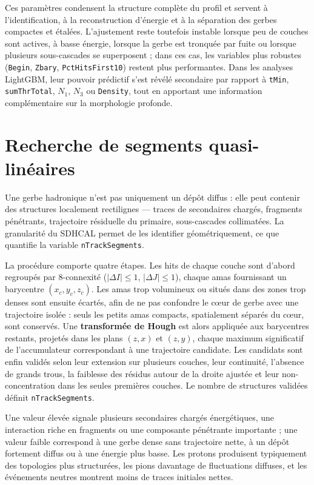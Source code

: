 Ces paramètres condensent la structure complète du profil et servent à l'identification, à la reconstruction d'énergie et à la séparation des gerbes compactes et étalées. L'ajustement reste toutefois instable lorsque peu de couches sont actives, à basse énergie, lorsque la gerbe est tronquée par fuite ou lorsque plusieurs sous-cascades se superposent ; dans ces cas, les variables plus robustes (\texttt{Begin}, \texttt{Zbary}, \texttt{PctHitsFirst10}) restent plus performantes. Dans les analyses LightGBM, leur pouvoir prédictif s'est révélé secondaire par rapport à \texttt{tMin}, \texttt{sumThrTotal}, \(N_1\), \(N_3\) ou \texttt{Density}, tout en apportant une information complémentaire sur la morphologie profonde.

\section{Recherche de segments quasi-linéaires}
\label{annexe:tracksegments}

Une gerbe hadronique n'est pas uniquement un dépôt diffus : elle peut contenir des structures localement rectilignes — traces de secondaires chargés, fragments pénétrants, trajectoire résiduelle du primaire, sous-cascades collimatées. La granularité du SDHCAL permet de les identifier géométriquement, ce que quantifie la variable \texttt{nTrackSegments}.

La procédure comporte quatre étapes. Les hits de chaque couche sont d'abord regroupés par 8-connexité (\(|\Delta I|\le1\), \(|\Delta J|\le1\)), chaque amas fournissant un barycentre \((x_c,y_c,z_c)\). Les amas trop volumineux ou situés dans des zones trop denses sont ensuite écartés, afin de ne pas confondre le cœur de gerbe avec une trajectoire isolée : seuls les petits amas compacts, spatialement séparés du cœur, sont conservés. Une \textbf{transformée de Hough} est alors appliquée aux barycentres restants, projetés dans les plans \((z,x)\) et \((z,y)\), chaque maximum significatif de l'accumulateur correspondant à une trajectoire candidate. Les candidats sont enfin validés selon leur extension sur plusieurs couches, leur continuité, l'absence de grands trous, la faiblesse des résidus autour de la droite ajustée et leur non-concentration dans les seules premières couches. Le nombre de structures validées définit \texttt{nTrackSegments}.

Une valeur élevée signale plusieurs secondaires chargés énergétiques, une interaction riche en fragments ou une composante pénétrante importante ; une valeur faible correspond à une gerbe dense sans trajectoire nette, à un dépôt fortement diffus ou à une énergie plus basse. Les protons produisent typiquement des topologies plus structurées, les pions davantage de fluctuations diffuses, et les événements neutres montrent moins de traces initiales nettes.


